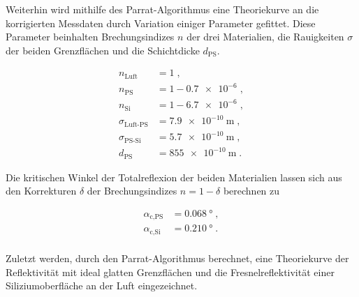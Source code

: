Weiterhin wird mithilfe des Parrat-Algorithmus eine Theoriekurve an die 
korrigierten Messdaten durch Variation einiger Parameter gefittet.
Diese Parameter beinhalten Brechungsindizes $n$ der drei Materialien, 
die Rauigkeiten $\sigma$ der beiden Grenzflächen und die Schichtdicke $d_\text{PS}$.

\vspace{-35pt}
\begin{align*}
    n_\text{Luft} &= 1 \; ,\\
    n_\text{PS} &= 1 - \num{0.7e-6} \; ,\\
    n_\text{Si} &= 1 - \num{6.7e-6} \; ,\\
    \sigma_\text{Luft-PS} &= \SI{7.9e-10}{\meter} \; ,\\
    \sigma_\text{PS-Si} &= \SI{5.7e-10}{\meter} \; ,\\
    d_\text{PS} &= \SI{855e-10}{\meter} \; .
\end{align*}

Die kritischen Winkel der Totalreflexion der beiden Materialien
lassen sich aus den Korrekturen $\delta$ der Brechungsindizes 
$n = 1 - \delta$ berechnen zu

\vspace{-20pt}
\begin{align*}
    \alpha_\text{c,PS} &= \SI{0.068}{\degree} \; ,\\
    \alpha_\text{c,Si} &= \SI{0.210}{\degree} \; .\\
\end{align*}

\vspace{-20pt}
Zuletzt werden, durch den Parrat-Algorithmus berechnet, eine Theoriekurve der Reflektivität mit
ideal glatten Grenzflächen und die Fresnelreflektivität einer Siliziumoberfläche an der Luft eingezeichnet.

